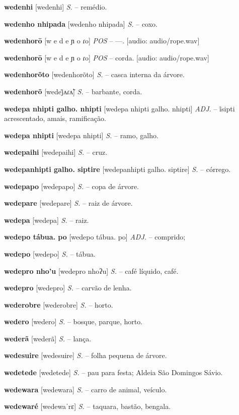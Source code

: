 {{{{{{{{{{{\textbf{wedenhi} [wedenhi] \textit{S.} -- remédio.

\textbf{wedenho nhipada} [wedenho nhipada] \textit{S.} -- coxo.

\textbf{wedenhorō} [w e d e ɲ o ɾo] \textit{POS} -- —. [audio: audio/rope.wav]{\faHeadphones}

\textbf{wedenhorō} [w e d e ɲ o ɾo] \textit{POS} -- corda. [audio: audio/rope.wav]{\faHeadphones}

\textbf{wedenhorõto} [wedenhorõto] \textit{S.} -- casca interna da árvore.

\textbf{wedenhorõ} [wedej̃ʌɾʌ̃] \textit{S.} -- barbante, corda.

\textbf{wedepa nhipti galho. nhipti} [wedepa nhipti galho. nhipti] \textit{ADJ.} -- ĩsipti acrescentado, amais, ramificação.

\textbf{wedepa nhipti} [wedepa nhipti] \textit{S.} -- ramo, galho.

\textbf{wedepaihi} [wedepaihi] \textit{S.} -- cruz.

\textbf{wedepanhipti galho. siptire} [wedepanhipti galho. siptire] \textit{S.} -- córrego.

\textbf{wedepapo} [wedepapo] \textit{S.} -- copa de árvore.

\textbf{wedepare} [wedepare] \textit{S.} -- raiz de árvore.

\textbf{wedepa} [wedepa] \textit{S.} -- raiz.

\textbf{wedepo tábua. po} [wedepo tábua. po] \textit{ADJ.} -- comprido;

\textbf{wedepo} [wedepo] \textit{S.} -- tábua.

\textbf{wedepro nho'u} [wedepro nhoʔu] \textit{S.} -- café líquido, café.

\textbf{wedepro} [wedepro] \textit{S.} -- carvão de lenha.

\textbf{wederobre} [wederobre] \textit{S.} -- horto.

\textbf{wedero} [wedero] \textit{S.} -- bosque, parque, horto.

\textbf{wederã} [wederã] \textit{S.} -- lança.

\textbf{wedesuire} [wedesuire] \textit{S.} -- folha pequena de árvore.

\textbf{wedetede} [wedetede] \textit{S.} -- pau para festa; Aldeia São Domingos Sávio.

\textbf{wedewara} [wedewara] \textit{S.} -- carro de animal, veículo.

\textbf{wedewaré} [wedewaˈrɛ] \textit{S.} -- taquara, bastão, bengala.

}}}}}}}}}}}
